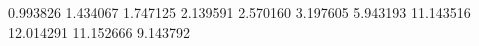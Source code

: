 0.993826
1.434067
1.747125
2.139591
2.570160
3.197605
5.943193
11.143516
12.014291
11.152666
9.143792
